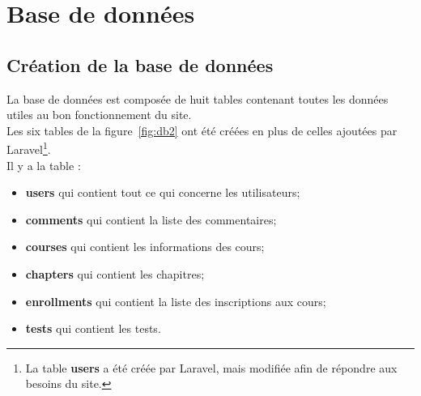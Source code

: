 \section{Base de données}
\label{sec:BD}


\subsection{Création de la base de données}
\label{subsec:creation-db}

La base de données est composée de huit tables contenant toutes les données utiles au bon fonctionnement du site. \\

Les six tables de la figure~\ref{fig:db2} ont été créées en plus de celles ajoutées par Laravel\footnote{La table \textbf{users} a été créée par Laravel, mais modifiée afin de répondre aux besoins du site.}. \\
Il y a la table :
\begin{itemize}
    
    \item \textbf{users} qui contient tout ce qui concerne les utilisateurs;
    
    \item \textbf{comments} qui contient la liste des commentaires;
    
    \item \textbf{courses} qui contient les informations des cours;
    
    \item \textbf{chapters} qui contient les chapitres;
    
    \item \textbf{enrollments} qui contient la liste des inscriptions aux cours;
    
    \item \textbf{tests} qui contient les tests.
    
\end{itemize} 

\vspace{0.5cm}

